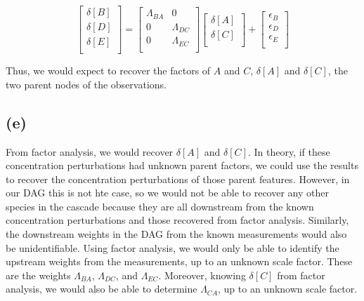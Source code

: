 \documentclass[12pt]{article}
\begin{document}
\[
    \begin{bmatrix}
                 \delta[B]  \\
                 \delta[D]  \\
                 \delta[E]  \\
         \end{bmatrix} = \begin{bmatrix}
                 \Lambda_{BA} & 0   \\
                 0 & \Lambda_{DC} \\
                 0 & \Lambda_{EC} \\
         \end{bmatrix} \begin{bmatrix}
                 \delta[A]  \\
                 \delta[C]  \\
         \end{bmatrix} +  \begin{bmatrix}
                 \epsilon_B  \\
                 \epsilon_D  \\
                 \epsilon_E  \\
         \end{bmatrix}
\]

Thus, we would expect to recover the factors of $A$ and $C$, $\delta[A]$ and $\delta[C]$, the two parent nodes of the observations.


\subsection*{(e)}

From factor analysis, we would recover $\delta[A]$ and $\delta[C]$.
In theory, if these concentration perturbations had unknown parent factors, we could use the results to recover the concentration perturbations of those parent features.
However, in our DAG this is not hte case, so we would not be able to recover any other species in the cascade because  they are all downstream from the known concentration perturbations and those recovered from factor analysis.
Similarly, the downstream weights in the DAG from the known measurements would also be unidentifiable.
Using factor analysis, we would only be able to identify the upstream weights from the measurements, up to an unknown scale factor.
These are the weights $\Lambda_{BA}$, $\Lambda_{DC}$, and $\Lambda_{EC}$.
Moreover, knowing $\delta[C]$ from factor analysis, we would also be able to determine $\Lambda_{CA}$, up to an unknown scale factor.
\end{document}

